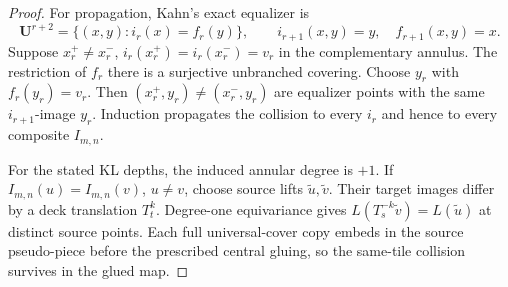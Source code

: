 \begin{proof}
For propagation, Kahn's exact equalizer is
\[
\mathbf U^{r+2}=\{(x,y):i_r(x)=f_r(y)\},\qquad i_{r+1}(x,y)=y,\quad f_{r+1}(x,y)=x .
\]
Suppose \(x_r^{+}\neq x_r^{-}\), \(i_r(x_r^{+})=i_r(x_r^{-})=v_r\) in the complementary annulus. The restriction of \(f_r\) there is a surjective unbranched covering. Choose \(y_r\) with \(f_r(y_r)=v_r\). Then \((x_r^{+},y_r)\neq(x_r^{-},y_r)\) are equalizer points with the same \(i_{r+1}\)-image \(y_r\). Induction propagates the collision to every \(i_r\) and hence to every composite \(I_{m,n}\).

For the stated KL depths, the induced annular degree is \(+1\). If \(I_{m,n}(u)=I_{m,n}(v)\), \(u\neq v\), choose source lifts \(\tilde u,\tilde v\). Their target images differ by a deck translation \(T_t^{k}\). Degree-one equivariance gives \(L(T_s^{-k}\tilde v)=L(\tilde u)\) at distinct source points. Each full universal-cover copy embeds in the source pseudo-piece before the prescribed central gluing, so the same-tile collision survives in the glued map.
\end{proof}